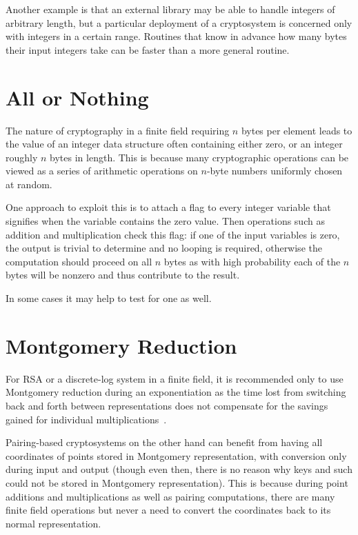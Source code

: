 Another example is that an external library may be able to handle integers
of arbitrary length, but a particular deployment of a cryptosystem is
concerned only with integers in a certain range. Routines that know
in advance how many bytes their input integers take can be faster than
a more general routine.

\section{All or Nothing}

The nature of cryptography in a finite field requiring $n$ bytes per element
leads to the value of an integer data structure
often containing either zero, or an integer roughly $n$ bytes in length.
This is because many cryptographic operations can be viewed as a series of
arithmetic operations on $n$-byte numbers uniformly chosen at random.

One approach to exploit this is to attach a flag to every integer variable
that signifies when the variable contains the zero value. Then operations
such as addition and multiplication check this flag: if one of the input
variables is zero, the output is trivial to determine and no looping
is required, otherwise the computation should proceed on all $n$ bytes as
with high probability each of the $n$ bytes will be nonzero and thus
contribute to the result.

In some cases it may help to test for one as well.


\section{Montgomery Reduction}

For RSA or a discrete-log system in a finite field, it is recommended
only to use Montgomery reduction during an exponentiation
as the time lost from switching back and forth between representations
does not compensate for the savings gained for individual multiplications~\cite{handbook}.

Pairing-based cryptosystems on the other hand can benefit from having
all coordinates of points stored in Montgomery representation, with conversion
only during input and output (though even then, there is no reason why keys
and such could not be stored in Montgomery representation). This is because
during point additions and multiplications as well as pairing computations,
there are many finite field operations but never a need to convert the
coordinates back to its normal representation.

